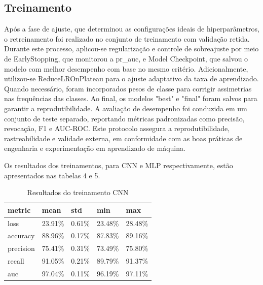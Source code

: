 \subsection{Treinamento}
Após a fase de ajuste, que determinou as configurações ideais de hiperparâmetros, o retreinamento foi realizado no conjunto de treinamento com validação retida. Durante este processo, aplicou-se regularização e controle de sobreajuste por meio de EarlyStopping, que monitorou a pr\_auc, e Model Checkpoint, que salvou o modelo com melhor desempenho com base no mesmo critério. Adicionalmente, utilizou-se ReduceLROnPlateau para o ajuste adaptativo da taxa de aprendizado. Quando necessário, foram incorporados pesos de classe para corrigir assimetrias nas frequências das classes. Ao final, os modelos "best" e "final" foram salvos para garantir a reprodutibilidade. A avaliação de desempenho foi conduzida em um conjunto de teste separado, reportando métricas padronizadas como precisão, revocação, F1 e AUC-ROC. Este protocolo assegura a reprodutibilidade, rastreabilidade e validade externa, em conformidade com as boas práticas de engenharia e experimentação em aprendizado de máquina. 

Os resultados dos treinamentos, para CNN e MLP respectivamente, estão apresentados nas tabelas 4 e 5. 

\begin{table}[H]
    \centering
    \caption{Resultados do treinamento CNN}
    \label{tab:train_cnn}
    \begin{tabular}{@{}lllll@{}}
        \toprule
        \textbf{metric} & \textbf{mean} & \textbf{std} & \textbf{min} & \textbf{max} \\
        \midrule
        loss & 23.91\% & 0.61\% & 23.48\% & 28.48\% \\
        accuracy & 88.96\% & 0.17\% & 87.83\% & 89.16\% \\
        precision & 75.41\% & 0.31\% & 73.49\% & 75.80\% \\
        recall & 91.05\% & 0.21\% & 89.79\% & 91.37\% \\
        auc & 97.04\% & 0.11\% & 96.19\% & 97.11\% \\
        \bottomrule
    \end{tabular}
\end{table}

